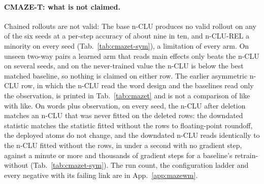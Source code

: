 \documentclass{article} %
\begin{document}
\paragraph{CMAZE-T: what is not claimed.} Chained rollouts are not valid: The base n-CLU produces no valid rollout
on any of the six seeds at a per-step accuracy of about nine in ten, and n-CLU-REL a minority on every seed
(Tab.~\ref{tab:cmazet-sym}), a limitation of every arm. On unseen two-way pairs a learned
arm that reads main effects only beats the n-CLU on several seeds, and on the never-trained value the
n-CLU is below the best matched baseline, so nothing is claimed on either row. The earlier asymmetric
n-CLU row, in which the n-CLU read the word design and the baselines read only the observation, is
printed in Tab.~\ref{tab:cmazet} and is not a comparison of like with like. On words plus
observation, on every seed, the n-CLU after deletion matches an n-CLU that was never fitted on the
deleted rows: the downdated statistic matches the statistic fitted without the rows to floating-point
roundoff, the deployed atoms do not change, and the downdated n-CLU reads identically
to the n-CLU fitted without the rows, in under a second with no gradient step,
against a minute or more and thousands of gradient steps for a baseline's retrain-without (Tab.~\ref{tab:cmazet-sym}).
The run count, the configuration ladder and every negative with its failing link are in
App.~\ref{app:mazewm}.

\end{document}
